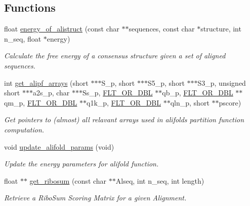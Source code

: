 \subsection*{Functions}
\begin{DoxyCompactItemize}
\item 
float \mbox{\hyperlink{group__consensus__fold_ga1c48869c03b49a342bf4cbdd61900081}{energy\+\_\+of\+\_\+alistruct}} (const char $\ast$$\ast$sequences, const char $\ast$structure, int n\+\_\+seq, float $\ast$energy)
\begin{DoxyCompactList}\small\item\em Calculate the free energy of a consensus structure given a set of aligned sequences. \end{DoxyCompactList}\item 
int \mbox{\hyperlink{group__consensus__fold_ga5349960075b1847720a2e9df021e2675}{get\+\_\+alipf\+\_\+arrays}} (short $\ast$$\ast$$\ast$S\+\_\+p, short $\ast$$\ast$$\ast$S5\+\_\+p, short $\ast$$\ast$$\ast$S3\+\_\+p, unsigned short $\ast$$\ast$$\ast$a2s\+\_\+p, char $\ast$$\ast$$\ast$Ss\+\_\+p, \mbox{\hyperlink{group__data__structures_ga31125aeace516926bf7f251f759b6126}{F\+L\+T\+\_\+\+O\+R\+\_\+\+D\+BL}} $\ast$$\ast$qb\+\_\+p, \mbox{\hyperlink{group__data__structures_ga31125aeace516926bf7f251f759b6126}{F\+L\+T\+\_\+\+O\+R\+\_\+\+D\+BL}} $\ast$$\ast$qm\+\_\+p, \mbox{\hyperlink{group__data__structures_ga31125aeace516926bf7f251f759b6126}{F\+L\+T\+\_\+\+O\+R\+\_\+\+D\+BL}} $\ast$$\ast$q1k\+\_\+p, \mbox{\hyperlink{group__data__structures_ga31125aeace516926bf7f251f759b6126}{F\+L\+T\+\_\+\+O\+R\+\_\+\+D\+BL}} $\ast$$\ast$qln\+\_\+p, short $\ast$$\ast$pscore)
\begin{DoxyCompactList}\small\item\em Get pointers to (almost) all relavant arrays used in alifold\textquotesingle{}s partition function computation. \end{DoxyCompactList}\item 
void \mbox{\hyperlink{group__consensus__fold_gac484c6bd429bafbd353b91044508d8e9}{update\+\_\+alifold\+\_\+params}} (void)
\begin{DoxyCompactList}\small\item\em Update the energy parameters for alifold function. \end{DoxyCompactList}\item 
float $\ast$$\ast$ \mbox{\hyperlink{group__consensus__fold_ga1116aed4b2dab5252cd23946d47d52c3}{get\+\_\+ribosum}} (const char $\ast$$\ast$Alseq, int n\+\_\+seq, int length)
\begin{DoxyCompactList}\small\item\em Retrieve a Ribo\+Sum Scoring Matrix for a given Alignment. \end{DoxyCompactList}\end{DoxyCompactItemize}
